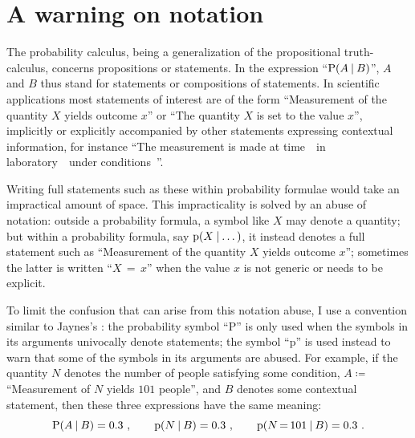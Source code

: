 \documentclass[\ifafour a4paper,12pt,\else a5paper,10pt,\fi%
onecolumn,oneside,article,%
british%
]{memoir}
\theoremstyle{remark}
\theoremstyle{innote}
\newcommand*{\defd}{\coloneqq}
\newcommand*{\p}{\mathrm{p}}%
\renewcommand*{\P}{\mathrm{P}}%
\renewcommand*{\|}[1][]{\nonscript\:#1\vert\nonscript\:\mathopen{}}
\newcommand*{\mo}[1][=]{\mathord{\,#1\,}}
\newcommand*{\sect}{\S}%
\newcommand*{\prop}[1]{\enquote{\textsf{#1}}}%
\begin{document}
\setcounter{section}{-1}
\section{A warning on notation}
\label{sec:intro}

The probability calculus, being a generalization of the propositional truth-calculus, concerns propositions or statements. In the expression \enquote{$\P(A \| B)$}, $A$ and $B$ thus stand for statements or compositions of statements. In scientific applications most statements of interest are of the form \prop{Measurement of the quantity $X$ yields outcome $x$} or \prop{The quantity $X$ is set to the value $x$}, implicitly or explicitly accompanied by other statements expressing contextual information, for instance \prop{The measurement is made at time~\textellipsis\ in laboratory~\textellipsis\ under conditions~\textellipsis}.

Writing full statements such as these within probability formulae would take an impractical amount of space. This impracticality is solved by an abuse of notation: outside a probability formula, a symbol like $X$ may denote a quantity; but within a probability formula, say $\p(X \| \dotso)$, it instead denotes a full statement such as \prop{Measurement of the quantity $X$ yields outcome $x$}; sometimes the latter is written \prop{$X\mo x$} when the value $x$ is not generic or needs to be explicit.

To limit the confusion that can arise from this notation abuse, I use a convention similar to Jaynes's \parencites*[\sect\,2.5 p.~43]{jaynes1994_r2003}: the probability symbol \enquote{$\P$} is only used when the symbols in its arguments univocally denote statements; the symbol \enquote{$\p$} is used instead to warn that some of the symbols in its arguments are abused. For example, if the quantity $N$ denotes the number of people satisfying some condition, $A\defd{}$\prop{Measurement of $N$ yields $101$ people}, and $B$ denotes some contextual statement, then these three expressions have the same meaning:
\begin{equation*}
  \P(A\|B) = 0.3 \ , \qquad
  \p(N \| B) = 0.3 \ ,\qquad
  \p(N\mo 101 \| B) = 0.3 \ .
\end{equation*}
\end{document}
